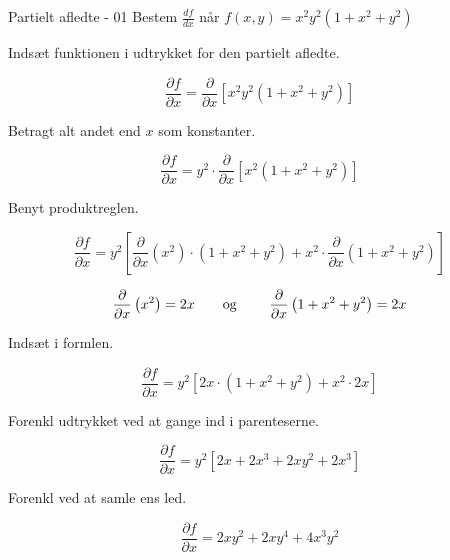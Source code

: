 \documentclass{article}
\begin{document}
\tableofcontents
\newpage

\begin{exercise}{Partielt afledte - 01}
Bestem $\frac{df}{dx}$ når $f(x,y) = x^2y^2\left(1 + x^2 + y^2\right)$


\hint
Indsæt funktionen i udtrykket for den partielt afledte.

\hint

\[
\frac{\partial f}{\partial x} = \frac{\partial }{\partial x} \left[ x^2y^2\left(1 + x^2 + y^2 \right)\right]
\]

\hint
Betragt alt andet end $x$ som konstanter.

\hint
\[
\frac{\partial f}{\partial x} = y^2 \cdot \frac{\partial }{\partial x} \left[ x^2\left(1 + x^2 + y^2 \right) \right]
\]

\hint

Benyt produktreglen.

\hint
\[
\frac{\partial f}{\partial x} = y^2\left[\frac{\partial }{\partial x}\left(x^2 \right) \cdot \left( 1 + x^2 + y^2 \right) + x^2 \cdot \frac{\partial}{\partial x} \left( 1 + x^2 + y^2\right) \right]
\]

\hint
\[\frac{\partial }{\partial x} \left(x^2\right) = 2x \textrm{\qquad og \qquad} \frac{\partial }{\partial x} \left(1 + x^2 + y^2\right) = 2x
\]

\hint
Indsæt i formlen.

\hint
\[
\frac{\partial f}{\partial x} = y^2\left[2x \cdot \left( 1 + x^2 + y^2 \right) + x^2 \cdot 2x \right]
\]

\hint
Forenkl udtrykket ved at gange ind i parenteserne.

\hint
\[
\frac{\partial f}{\partial x} = y^2 \left[ 2x + 2x^3 + 2xy^2 + 2x^3 \right]
\]

\hint
Forenkl ved at samle ens led.

\hint
\[
\frac{\partial f}{\partial x} = 2xy^2 + 2xy^4 + 4x^3y^2
\]

\end{exercise}

\newpage
\end{document}
